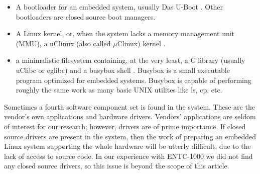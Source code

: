 \documentclass[conference]{IEEEtran}
\newcommand{\nota}[1]{}
\begin{document}
\begin{itemize}
\item A bootloader for an embedded system, usually Das U-Boot \cite{uboot}. Other bootloaders are closed source boot managers.
\item A Linux kernel, or, when the system lacks a memory management unit (MMU), a uClinux (also called $\mu$Clinux) kernel \cite{uclinux}.
\item a minimalistic filesystem containing, at the very least, a C library (usually uClibc or eglibc) and a busybox shell \cite{busybox}. Busybox is a small executable program optimized for embedded systems. Busybox is capable of performing roughly the same work as many basic UNIX utilites like ls, cp, etc.
\end{itemize}
\nota {
Algunas veces existe un cuarto componente de software, que son las aplicaciones
y controladores de hardware (del inglés ``drivers'') del fabricante.
Las aplicaciones muchas veces no son de interés, pero si los controladores.
Si existiesen controladores de código cerrado
entonces el trabajo de preparar un Linux embebido con soporte
para todo el hardware será difícil (debido a que no se tiene acceso
al código fuente). En nuestra experiencia con el ENTC-1000 no encontramos drivers
de código cerrado, por lo que este punto está fuera del alcance de este artículo. 
}

Sometimes a fourth software component set is found in the system. These are the vendor's own applications and hardware drivers. Vendors' applications are seldom of interest for our research; however, drivers are of prime importance. If closed source drivers are present in the system, then the work of preparing an embedded Linux system supporting the whole hardware will be utterly difficult, due to the lack of access to source code. In our experience with ENTC-1000 we did not find any closed source drivers, so this issue is beyond the scope of this article.
 
\nota{
El trabajo realizado en este punto fue la preparación
de dos sistemas Linux embebidos completos de reemplazo: Amstrong y emDebian.
La documentación para preparar sistemas Linux embebidos es amplia y públicamente
disponible (referencias). Además, existen decenas de
distribuciones Linux para embebidos,
o entornos de desarrollo de distribuciones Linux para embebidos 
\footnote{No confundir distribución con entorno de desarrollo}. Estas herramientas
facilitan la preparación de un sistema para un dispositivo específico.
Algunas de estos proyectos son Openwrt, Buildroot, u OpenEmbedded (referencias).

Una vez que se tiene el conocimiento en cómo construir (compilar y configurar)
y operar los componentes de software para la arquitectura destino, se
debe realizar un análisis de si es posible o no modificar el firmware original.
}
\end{document}
